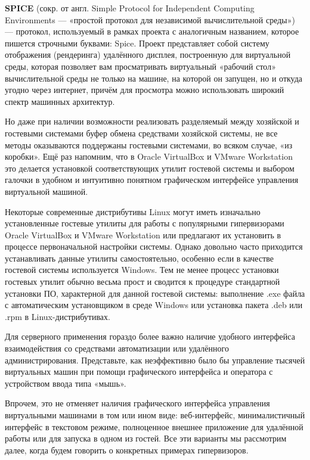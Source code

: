 \documentclass[14pt, a4paper]{article}
\begin{document}
\textbf{SPICE} (сокр. от англ. Simple Protocol for Independent Computing Environments — «простой протокол для
независимой вычислительной среды») — протокол, используемый в рамках проекта с аналогичным
названием, которое пишется строчными буквами: Spice. Проект представляет собой систему
отображения (рендеринга) удалённого дисплея, построенную для виртуальной среды, которая
позволяет вам просматривать виртуальный «рабочий стол» вычислительной среды не только на
машине, на которой он запущен, но и откуда угодно через интернет, причём для просмотра можно
использовать широкий спектр машинных архитектур.

Но даже при наличии возможности реализовать разделяемый между хозяйской и гостевыми
системами буфер обмена средствами хозяйской системы, не все методы оказываются поддержаны
гостевыми системами, во всяком случае, «из коробки». Ещё раз напомним, что в Oracle VirtualBox и
VMware Workstation это делается установкой соответствующих утилит гостевой системы и выбором
галочки в удобном и интуитивно понятном графическом интерфейсе управления виртуальной
машиной.

Некоторые современные дистрибутивы Linux могут иметь изначально установленные гостевые
утилиты для работы с популярными гипервизорами Oracle VirtualBox и VMware Workstation или
предлагают их установить в процессе первоначальной настройки системы. Однако довольно часто
приходится устанавливать данные утилиты самостоятельно, особенно если в качестве гостевой
системы используется Windows. Тем не менее процесс установки гостевых утилит обычно весьма
прост и сводится к процедуре стандартной установки ПО, характерной для данной гостевой системы:
выполнение .exe файла с автоматическим установщиком в среде Windows или установка пакета .deb
или .rpm в Linux-дистрибутивах.

Для серверного применения гораздо более важно наличие удобного интерфейса взаимодействия со
средствами автоматизации или удалённого администрирования. Представьте, как неэффективно
было бы управление тысячей виртуальных машин при помощи графического интерфейса и оператора
с устройством ввода типа «мышь».

Впрочем, это не отменяет наличия графического интерфейса управления виртуальными машинами в
том или ином виде: веб-интерфейс, минималистичный интерфейс в текстовом режиме, полноценное
внешнее приложение для удалённой работы или для запуска в одном из гостей. Все эти варианты мы
рассмотрим далее, когда будем говорить о конкретных примерах гипервизоров. \\ 
\end{document}
